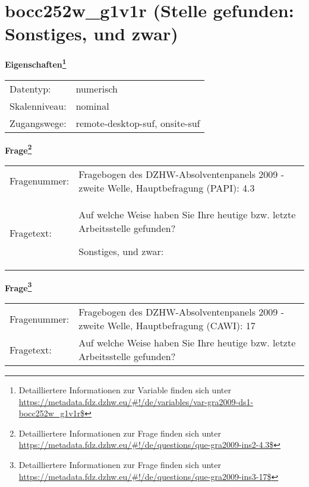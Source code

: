 
    \setcounter{footnote}{0}

    \vspace*{-1.8cm}
	\section{bocc252w\_g1v1r (Stelle gefunden: Sonstiges, und zwar)}
	\label{section:bocc252w_g1v1r}



    \vspace*{0.5cm}
    \noindent\textbf{Eigenschaften\footnote{Detailliertere Informationen zur Variable finden sich unter
		\url{https://metadata.fdz.dzhw.eu/\#!/de/variables/var-gra2009-ds1-bocc252w_g1v1r$}}}\\
	\begin{tabularx}{\hsize}{@{}lX}
	Datentyp: & numerisch \\
	Skalenniveau: & nominal \\
	Zugangswege: &
	  remote-desktop-suf, 
	  onsite-suf
 \\
    \end{tabularx}



				\vspace*{0.5cm}
                \noindent\textbf{Frage\footnote{Detailliertere Informationen zur Frage finden sich unter
		              \url{https://metadata.fdz.dzhw.eu/\#!/de/questions/que-gra2009-ins2-4.3$}}}\\
				\begin{tabularx}{\hsize}{@{}lX}
					Fragenummer: &
					  Fragebogen des DZHW-Absolventenpanels 2009 - zweite Welle, Hauptbefragung (PAPI):
					  4.3
 \\
					Fragetext: & Auf welche Weise haben Sie Ihre heutige bzw. letzte Arbeitsstelle gefunden?\par  Sonstiges, und zwar: \\
				\end{tabularx}
				\vspace*{0.5cm}
                \noindent\textbf{Frage\footnote{Detailliertere Informationen zur Frage finden sich unter
		              \url{https://metadata.fdz.dzhw.eu/\#!/de/questions/que-gra2009-ins3-17$}}}\\
				\begin{tabularx}{\hsize}{@{}lX}
					Fragenummer: &
					  Fragebogen des DZHW-Absolventenpanels 2009 - zweite Welle, Hauptbefragung (CAWI):
					  17
 \\
					Fragetext: & Auf welche Weise haben Sie Ihre heutige bzw. letzte Arbeitsstelle gefunden? \\
				\end{tabularx}





